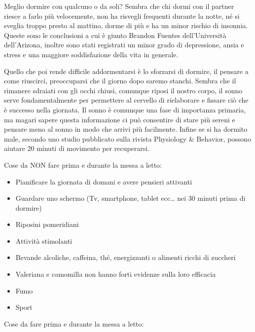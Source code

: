 \documentclass[12pt]{book} %
\begin{document}
\begin{mdframed}[linewidth=1pt]
Meglio dormire con qualcuno o da soli? Sembra che chi dormi con
il partner riesce a farlo più velocemente, non ha risvegli frequenti durante la notte, né si sveglia troppo presto al
mattino, dorme di più e ha un minor rischio di insonnia. Queste sono le conclusioni a cui è giunto Brandon Fuentes
dell'Università dell'Arizona, inoltre sono stati registrati un minor grado di depressione, ansia e stress e una
maggiore soddisfazione della vita in generale. 

Quello che poi rende difficile addormentarsi è lo sforzarsi di dormire, il pensare a come riuscirci, preoccuparsi che il giorno dopo saremo stanchi. Sembra che il rimanere sdraiati con gli occhi chiusi, comunque riposi il nostro corpo, il sonno serve fondamentalmente per permettere al cervello di rielaborare e fissare ciò che è successo nella giornata. Il sonno è comunque una fase di importanza primaria, ma magari sapere questa informazione ci può consentire di stare più sereni e pensare meno al sonno in modo che arrivi più facilmente. 
Infine se si ha dormito male, secondo uno studio pubblicato sulla rivista Physiology \& Behavior, possono aiutare 20 minuti di movimento per recuperarsi.

Cose da NON fare prima e durante la messa a letto:

\begin{itemize}
\item Pianificare la giornata di domani e avere pensieri attivanti
\item Guardare uno schermo (Tv, smartphone, tablet ecc… nei 30 minuti prima di dormire)
\item Riposini pomeridiani
\item Attività stimolanti
\item Bevande alcoliche, caffeina, thé, energizzanti o alimenti ricchi di zuccheri
\item Valeriana e camomilla non hanno forti evidenze sulla loro efficacia
\item Fumo
\item Sport
\end{itemize}

Cose da fare prima e durante la messa a letto:


\end{mdframed}
\end{document}
